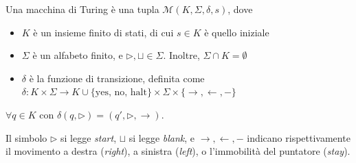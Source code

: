 \begin{definition}
    Una macchina di Turing è una tupla $\mathcal{M}(K,\Sigma,\delta,s)$, dove
    \begin{itemize}
        \item $K$ è un insieme finito di stati, di cui $s\in K$ è quello iniziale
        \item $\Sigma$ è un alfabeto finito, e $\rhd,\sqcup\in\Sigma$. Inoltre, $\Sigma\cap K = \emptyset$
        \item $\delta$ è la funzione di transizione, definita come $\delta: K\times\Sigma \rightarrow K\cup\{\text{yes, no, halt}\}\times\Sigma\times\{\to,\gets,-\}$
    \end{itemize}
    $\forall q\in K$ con $\delta(q,\rhd)=(q',\rhd,\to)$.
\end{definition}
Il simbolo $\rhd$ si legge \emph{start}, $\sqcup$ si legge \emph{blank}, e $\to,\gets,-$ indicano rispettivamente il movimento a destra (\emph{right}), a sinistra (\emph{left}), o l'immobilità del puntatore (\emph{stay}).

